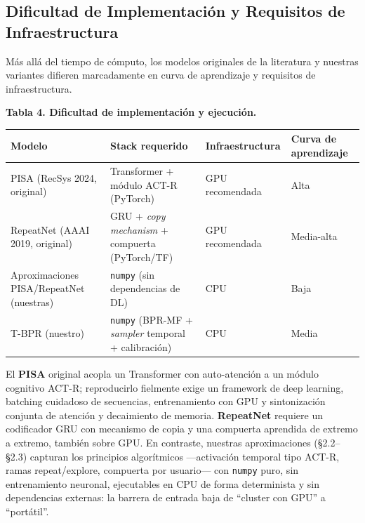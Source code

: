 \documentclass{article}
\begin{document}
\subsection{Dificultad de Implementación y Requisitos de Infraestructura}\label{dificultad-de-implementaciuxf3n-y-requisitos-de-infraestructura}

Más allá del tiempo de cómputo, los modelos originales de la literatura y nuestras variantes difieren marcadamente en curva de aprendizaje y requisitos de infraestructura.

\textbf{Tabla 4. Dificultad de implementación y ejecución.}

{\def\LTcaptype{none} %
\begin{longtable}[]{@{}
  >{\raggedright\arraybackslash}p{}
  >{\raggedright\arraybackslash}p{}
  >{\raggedright\arraybackslash}p{}
  >{\raggedright\arraybackslash}p{}@{}}
\toprule\noalign{}
\begin{minipage}[b]{\linewidth}\raggedright
Modelo
\end{minipage} & \begin{minipage}[b]{\linewidth}\raggedright
Stack requerido
\end{minipage} & \begin{minipage}[b]{\linewidth}\raggedright
Infraestructura
\end{minipage} & \begin{minipage}[b]{\linewidth}\raggedright
Curva de aprendizaje
\end{minipage} \\
\midrule\noalign{}
\endhead
\bottomrule\noalign{}
\endlastfoot
PISA (RecSys 2024, original) & Transformer + módulo ACT-R (PyTorch) & GPU recomendada & Alta \\
RepeatNet (AAAI 2019, original) & GRU + \emph{copy mechanism} + compuerta (PyTorch/TF) & GPU recomendada & Media-alta \\
Aproximaciones PISA/RepeatNet (nuestras) & \texttt{numpy} (sin dependencias de DL) & CPU & Baja \\
T-BPR (nuestro) & \texttt{numpy} (BPR-MF + \emph{sampler} temporal + calibración) & CPU & Media \\
\end{longtable}
}

El \textbf{PISA} original acopla un Transformer con auto-atención a un módulo cognitivo ACT-R; reproducirlo fielmente exige un framework de deep learning, batching cuidadoso de secuencias, entrenamiento con GPU y sintonización conjunta de atención y decaimiento de memoria. \textbf{RepeatNet} requiere un codificador GRU con mecanismo de copia y una compuerta aprendida de extremo a extremo, también sobre GPU. En contraste, nuestras aproximaciones (§2.2--§2.3) capturan los principios algorítmicos ---activación temporal tipo ACT-R, ramas repeat/explore, compuerta por usuario--- con \texttt{numpy} puro, sin entrenamiento neuronal, ejecutables en CPU de forma determinista y sin dependencias externas: la barrera de entrada baja de ``cluster con GPU'' a ``portátil''.
\end{document}
